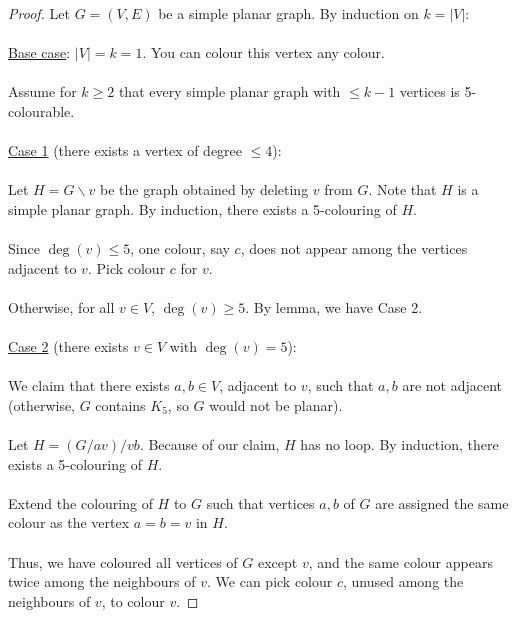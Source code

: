 \documentclass[]{article}
\theoremstyle{definition}
\begin{document}
			\begin{proof}
				Let $G = (V, E)$ be a simple planar graph. By induction on $k = |V|$:
				\\ \\
				\underline{Base case}: $|V| = k = 1$. You can colour this vertex any colour.
				\\ \\
				Assume for $k \ge 2$ that every simple planar graph with $\le k - 1$ vertices is 5-colourable.
				\\ \\
				\underline{Case 1} (there exists a vertex of degree $\le 4$):
				\\ \\
				Let $H = G \backslash v$ be the graph obtained by deleting $v$ from $G$. Note that $H$ is a simple planar graph. By induction, there exists a 5-colouring of $H$.
				\\ \\
				Since $\deg(v) \le 5$, one colour, say $c$, does not appear among the vertices adjacent to $v$. Pick colour $c$ for $v$.
				\\ \\
				Otherwise, for all $v \in V$, $\deg(v) \ge 5$. By lemma, we have Case 2.
				\\ \\
				\underline{Case 2} (there exists $v \in V$ with $\deg(v) = 5$):
				\\ \\
				We claim that there exists $a, b \in V$, adjacent to $v$, such that $a, b$ are not adjacent (otherwise, $G$ contains $K_5$, so $G$ would not be planar).
				\\ \\
				Let $H = (G/av)/vb$. Because of our claim, $H$ has no loop. By induction, there exists a 5-colouring of $H$.
				\\ \\
				Extend the colouring of $H$ to $G$ such that vertices $a, b$ of $G$ are assigned the same colour as the vertex $a = b = v$ in $H$.
				\\ \\
				Thus, we have coloured all vertices of $G$ except $v$, and the same colour appears twice among the neighbours of $v$. We can pick colour $c$, unused among the neighbours of $v$, to colour $v$.
			\end{proof}
\end{document}
